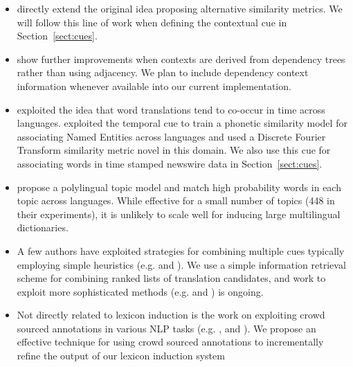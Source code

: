 \documentclass{article}
\newcommand{\mtodo}[1]{}
\newcommand{\secref}[1]{Section~\ref{#1}}
\begin{document}
\begin{itemize}
\setlength{\parskip}{0pt}
  \item \cite{Rapp:1999,Fung:1998} directly extend the original idea proposing alternative similarity metrics.  We will follow this line of work when defining the contextual cue in \secref{sect:cues}.
  \item \cite{Garera:2009} show further improvements when contexts are derived from dependency trees rather than using adjacency.  We plan to include dependency context information whenever available into our current implementation.  
  \item \cite{Schafer:2002} exploited the idea that word translations tend to co-occur in time across languages. \cite{Klementiev:2006b} exploited the temporal cue to train a phonetic similarity model for associating Named Entities across languages and used a Discrete Fourier Transform similarity metric novel in this domain.  We also use this cue for associating words in time stamped newswire data in \secref{sect:cues}.
  \item \cite{Mimno:2009} propose a polylingual topic model and match high probability words in each topic across languages.  While effective for a small number of topics (448 in their experiments), it is unlikely to scale well for inducing large multilingual dictionaries.  %
  \item A few authors have exploited strategies for combining multiple cues typically employing simple heuristics (e.g. \cite{Schafer:2002} and \cite{Koehn:2002}).  We use a simple information retrieval scheme for combining ranked lists of translation candidates, and work to exploit more sophisticated methods (e.g. \cite{Klementiev:2006b} and \cite{Klementiev:2008a}) is ongoing.
  \item Not directly related to lexicon induction is the work on exploiting crowd sourced annotations in various NLP tasks (e.g. \cite{Snow:2008}, and \cite{CCB:2009}).  We  propose an effective technique for using crowd sourced annotations to incrementally refine the output of our lexicon induction system
\end{itemize}  \mtodo{A few words about the scalability of Haghighli's model.}
\end{document}

